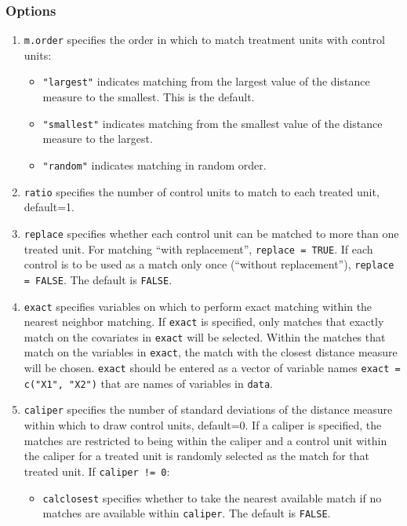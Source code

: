 \documentclass[oneside,letterpaper,titlepage]{article}
\begin{document}
\subsubsection{Options}
\begin{enumerate}
\item \texttt{m.order}  specifies the order in which to match
  treatment units with control units:
  \begin{itemize}
  \item {\tt "largest"} indicates matching from the largest value of
    the distance measure to the smallest. This is the default.
  \item {\tt "smallest"} indicates matching from the smallest value of
    the distance measure to the largest.
  \item {\tt "random"} indicates matching in random order.
  \end{itemize}
\item \texttt{ratio} specifies the number of control units to match to
  each treated unit, default=1.
\item \texttt{replace} specifies whether each control unit can be
  matched to more than one treated unit.  For matching ``with
  replacement'', \texttt{replace = TRUE}.  If each control is to be
  used as a match only once (``without replacement''), \texttt{replace
    = FALSE}. The default is {\tt FALSE}.
\item \texttt{exact} specifies variables on which to perform exact
  matching within the nearest neighbor matching.  If \texttt{exact} is
  specified, only matches that exactly match on the covariates in
  \texttt{exact} will be selected.  Within the matches that match on
  the variables in \texttt{exact}, the match with the closest distance
  measure will be chosen.  \texttt{exact} should be entered as a
  vector of variable names \texttt{exact = c("X1", "X2")} that are
  names of variables in \texttt{data}.
\item \texttt{caliper} specifies the number of standard deviations of
  the distance measure within which to draw control units, default=0.
  If a caliper is specified, the matches are restricted to being
  within the caliper and a control unit within the caliper for a
  treated unit is randomly selected as the match for that treated
  unit.  If \texttt{caliper != 0}:
  \begin{itemize} 
  \item \texttt{calclosest} specifies whether to take the nearest
    available match if no matches are available within
    \texttt{caliper}. The default is {\tt FALSE}.

\end{itemize}
\end{enumerate}
\end{document}
